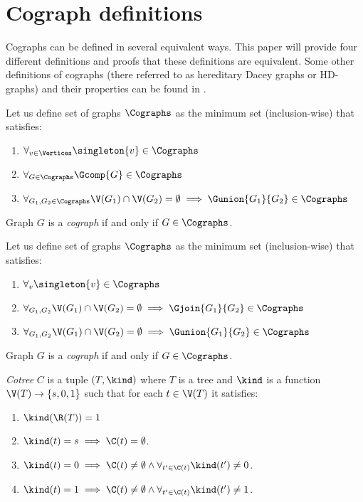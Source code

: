 
\section{Cograph definitions}

Cographs can be defined in several equivalent ways. This paper will provide four different definitions and proofs that these definitions are equivalent. Some other definitions of cographs (there referred to as hereditary Dacey graphs or HD-graphs) and their properties can be found in \cite{sumner}.

\begin{defi}\label{codef1}
    Let us define set of graphs $\Cographs$ as the minimum set (inclusion-wise) that satisfies:
    \begin{enumerate}
        \item $\forall_{v \in \Vertices} \singleton{v} \in \Cographs$
        \item $\forall_{G \in \Cographs} \Gcomp{G} \in \Cographs$
        \item $\forall_{G_1, G_2 \in \Cographs} \V(G_1) \cap \V(G_2) = \emptyset \implies \Gunion{G_1}{G_2} \in \Cographs$
    \end{enumerate}
    Graph $G$ is a \emph{cograph} if and only if $G \in \Cographs$.
\end{defi}
\begin{defi}\label{codef2}
    Let us define set of graphs $\Cographs$ as the minimum set (inclusion-wise) that satisfies:
    \begin{enumerate}
        \item $\forall_v \singleton{v} \in \Cographs$
        \item $\forall_{G_1, G_2} \V(G_1) \cap \V(G_2) = \emptyset \implies \Gjoin{G_1}{G_2} \in \Cographs$
        \item $\forall_{G_1, G_2} \V(G_1) \cap \V(G_2) = \emptyset \implies \Gunion{G_1}{G_2} \in \Cographs$
    \end{enumerate}
    Graph $G$ is a \emph{cograph} if and only if $G \in \Cographs$.
\end{defi}

\begin{defi}
    \emph{Cotree} $C$ is a tuple $(T, \kind)$ where $T$ is a tree and $\kind$ is a function $\V(T) \to \{s,0,1\}$ such that for each $t \in \V(T)$ it satisfies:
    \begin{enumerate}
        \item $\kind(\R(T)) = 1$
        \item $\kind(t) = s \implies \C(t) = \emptyset$.
        \item $\kind(t) = 0 \implies \C(t) \neq \emptyset \land \forall_{t' \in \C(t)} \kind(t') \neq 0$.
        \item $\kind(t) = 1 \implies \C(t) \neq \emptyset \land \forall_{t' \in \C(t)} \kind(t') \neq 1$.
    \end{enumerate}
\end{defi}

